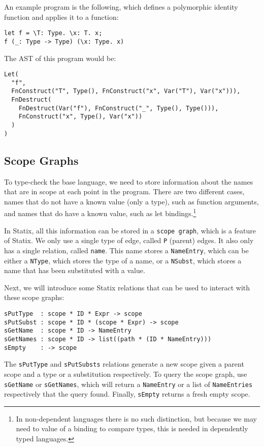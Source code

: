 \documentclass[a4paper,UKenglish,cleveref, autoref, thm-restate]{oasics-v2021}
\begin{document}
An example program is the following, which defines a polymorphic identity function and applies it to a function:

\begin{lstlisting}
let f = \T: Type. \x: T. x;
f (_: Type -> Type) (\x: Type. x)
\end{lstlisting}
The AST of this program would be:
\begin{lstlisting}
Let(
  "f", 
  FnConstruct("T", Type(), FnConstruct("x", Var("T"), Var("x"))),
  FnDestruct(
	FnDestruct(Var("f"), FnConstruct("_", Type(), Type())),
	FnConstruct("x", Type(), Var("x"))
  )
)
\end{lstlisting}



\subsection{Scope Graphs}
\label{sec:coc-scopes}

To type-check the base language, we need to store information about the names that are in scope at each point in the program. There are two different cases, names that do not have a known value (only a type), such as function arguments, and names that do have a known value, such as let bindings.\footnote{In non-dependent languages there is no such distinction, but because we may need to value of a binding to compare types, this is needed in dependently typed languages.}

In Statix, all this information can be stored in a \verb|scope graph|\cite{scope_graphs}, which is a feature of Statix. We only use a single type of edge, called \verb|P| (parent) edges. It also only has a single relation, called \verb|name|. This name stores a \verb|NameEntry|, which can be either a \verb|NType|, which stores the type of a name, or a \verb|NSubst|, which stores a name that has been substituted with a value. 

Next, we will introduce some Statix relations that can be used to interact with these scope graphs:

\begin{lstlisting}
sPutType  : scope * ID * Expr -> scope
sPutSubst : scope * ID * (scope * Expr) -> scope
sGetName  : scope * ID -> NameEntry
sGetNames : scope * ID -> list((path * (ID * NameEntry)))
sEmpty    : -> scope
\end{lstlisting}
The \verb|sPutType| and \verb|sPutSubsts| relations generate a new scope given a parent scope and a type or a substitution respectively. To query the scope graph, use \verb|sGetName| or \verb|sGetNames|, which will return a \verb|NameEntry| or a list of \verb|NameEntries| respectively that the query found. Finally, \verb|sEmpty| returns a fresh empty scope.
\end{document}
